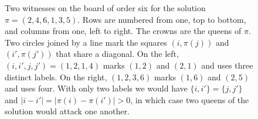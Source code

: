 \begin{figure}[htbp]
\centering
{}
\caption{Two witnesses on the board of order six for the solution $\pi=(2,4,6,1,3,5)$. Rows
are numbered from one, top to bottom, and columns from one, left to right. The crowns are the
queens of $\pi$. Two circles joined by a line mark the squares $(i,\pi(j))$ and $(i',\pi(j'))$
that share a diagonal. On the left, $(i,i',j,j')=(1,2,1,4)$ marks $(1,2)$ and $(2,1)$ and uses
three distinct labels. On the right, $(1,2,3,6)$ marks $(1,6)$ and $(2,5)$ and uses four. With
only two labels we would have $\{i,i'\}=\{j,j'\}$ and $|i-i'|=|\pi(i)-\pi(i')|>0$, in which
case two queens of the solution would attack one another.}\label{fig:testigos}
\end{figure}
